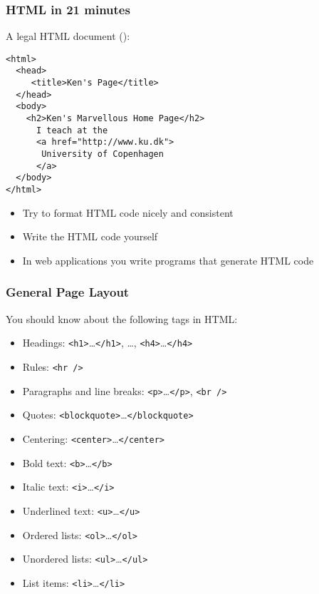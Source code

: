 \documentclass[dvipsnames,handout]{beamer}
\begin{document}
\begin{frame}[fragile]
\frametitle{HTML in 21 minutes}

A legal HTML document ():

\begin{small}
\begin{verbatim}
<html>
  <head>
     <title>Ken's Page</title>
  </head>
  <body>
    <h2>Ken's Marvellous Home Page</h2>
      I teach at the
      <a href="http://www.ku.dk">
       University of Copenhagen
      </a>
  </body>
</html>
\end{verbatim}
\end{small}

\begin{itemize}
\item Try to format HTML code nicely and consistent

\item Write the HTML code yourself

\item In web applications you write programs that generate HTML code
\end{itemize}

\end{frame}

\begin{frame}
\frametitle{General Page Layout}

You should know about the following tags in HTML:

\begin{itemize}
\item Headings: \texttt{<h1>}\ldots \texttt{</h1>}, \ldots, \texttt{<h4>}\ldots \texttt{</h4>}
\item Rules: \texttt{<hr />}
\item Paragraphs and line breaks: \texttt{<p>}\ldots \texttt{</p>},
  \texttt{<br />}
\item Quotes: \texttt{<blockquote>}\ldots \texttt{</blockquote>}
\item Centering: \texttt{<center>}\ldots \texttt{</center>}
\item Bold text: \texttt{<b>}\ldots \texttt{</b>}
\item Italic text: \texttt{<i>}\ldots \texttt{</i>}
\item Underlined text: \texttt{<u>}\ldots \texttt{</u>}
\item Ordered lists: \texttt{<ol>}\ldots \texttt{</ol>}
\item Unordered lists: \texttt{<ul>}\ldots \texttt{</ul>}
\item List items: \texttt{<li>}\ldots \texttt{</li>}
\end{itemize}
\end{frame}
\end{document}
